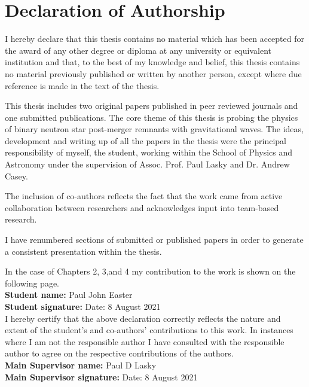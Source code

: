 \documentclass[../Thesis.tex]{subfiles}
\begin{document}
\chapter{Declaration of Authorship}
I hereby declare that this thesis contains no material which has been accepted for the award of any other degree or diploma at any university or equivalent institution and that, to the best of my knowledge and belief, this thesis contains no material previously published or written by another person, except where due reference is made in the text of the thesis. 

This thesis includes two original papers published in peer reviewed journals and one submitted publications. The core theme of this thesis is probing the physics of binary neutron star post-merger remnants with gravitational waves. The ideas, development and writing up of all the papers in the thesis were the principal responsibility of myself, the student, working within the School of Physics and Astronomy under the supervision of Assoc. Prof. Paul Lasky and Dr. Andrew Casey.
	
The inclusion of co-authors reflects the fact that the work came from active collaboration between researchers and acknowledges input into team-based research.

I have renumbered sections of submitted or published papers in order to generate a consistent presentation within the thesis.

In the case of Chapters 2, 3,and 4 my contribution to the work is shown on the following page. \\[0.75cm]
%
\tabto{0cm}\textbf{Student name:}  Paul John Easter \\[0.75cm]
\tabto{0cm}\textbf{Student signature:} \tabto{10cm} Date: 8 August 2021 \\[0.75cm]
%
%
I hereby certify that the above declaration correctly reflects the nature and extent of the student’s and co-authors’ contributions to this work. In instances where I am not the responsible author I have consulted with the responsible author to agree on the respective contributions of the authors. \\[0.75cm] 
%
\tabto{0cm}\textbf{Main Supervisor name:} Paul D Lasky \\[0.75cm]
\tabto{0cm}\textbf{Main Supervisor signature:}	\tabto{10cm} Date: 8 August 2021

\pagebreak
\end{document}
